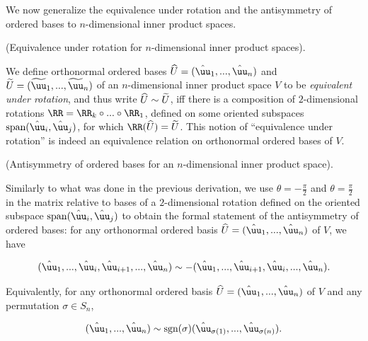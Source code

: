 We now generalize the equivalence under rotation and the antisymmetry of ordered bases to $n$-dimensional inner product spaces.

\begin{defn}
    (Equivalence under rotation for $n$-dimensional inner product spaces).
    
    We define orthonormal ordered bases $\hU = (\huu_1, ..., \huu_n)$ and $\tU = (\tuu_1, ..., \tuu_n)$ of an $n$-dimensional inner product space $V$ to be \textit{equivalent under rotation}, and thus write $\widehat{U} \sim \widetilde{U}$, iff there is a composition of $2$-dimensional rotations $\RR = \RR_k \circ ... \circ \RR_1$, defined on some oriented subspaces $\spann(\huu_i, \huu_j)$, for which $\RR(\hU) = \tU$. This notion of ``equivalence under rotation'' is indeed an equivalence relation on orthonormal ordered bases of $V$.
\end{defn}

\begin{theorem}
    (Antisymmetry of ordered bases for an $n$-dimensional inner product space).
    
     Similarly to what was done in the previous derivation, we use $\theta = -\frac{\pi}{2}$ and $\theta = \frac{\pi}{2}$ in the matrix relative to bases of a $2$-dimensional  rotation defined on the oriented subspace $\spann(\huu_i, \huu_j)$ to obtain the formal statement of the antisymmetry of ordered bases: for any orthonormal ordered basis $\hU = (\huu_1, ..., \huu_n)$ of $V$, we have
    
    \begin{align*}
        (\huu_1, ..., \huu_i, \huu_{i + 1}, ..., \huu_n)
        \sim
        -(\huu_1, ..., \huu_{i + 1}, \huu_i, ..., \huu_n).
    \end{align*}
    
    Equivalently, for any orthonormal ordered basis $\hU = (\huu_1, ..., \huu_n)$ of $V$ and any permutation $\sigma \in S_n$,
    
    \begin{align*}
        (\huu_1, ..., \huu_n)
        \sim
        \sgn(\sigma) (\huu_{\sigma(1)}, ..., \huu_{\sigma(n)}).
    \end{align*}
\end{theorem}

